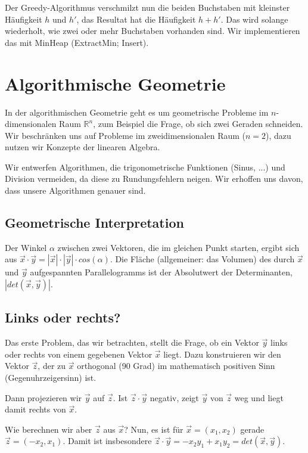 \documentclass[12pt]{article}
\begin{document}
Der Greedy-Algorithmus verschmilzt nun die beiden Buchstaben mit kleinster Häufigkeit $h$ und $h'$, das Resultat hat die Häufigkeit $h + h'$. Das wird solange wiederholt, wie zwei oder mehr Buchstaben vorhanden sind. Wir implementieren das mit MinHeap (ExtractMin; Insert).

\section{Algorithmische Geometrie}

In der algorithmischen Geometrie geht es um geometrische Probleme im $n$-dimensionalen Raum $\mathbb{R}^n$, zum Beispiel die Frage, ob sich zwei Geraden schneiden. Wir beschränken uns auf Probleme im zweidimensionalen Raum ($n = 2$), dazu nutzen wir Konzepte der linearen Algebra.

Wir entwerfen Algorithmen, die trigonometrische Funktionen (Sinus, ...) und Division vermeiden, da diese zu Rundungsfehlern neigen. Wir erhoffen uns davon, dass unsere Algorithmen genauer sind.

\subsection{Geometrische Interpretation}

Der Winkel $\alpha$ zwischen zwei Vektoren, die im gleichen Punkt starten, ergibt sich aus $\vec{x} \cdot \vec{y} = |\vec{x}| \cdot |\vec{y}| \cdot cos(\alpha)$. Die Fläche (allgemeiner: das Volumen) des durch $\vec{x}$ und $\vec{y}$ aufgespannten Parallelogramms ist der Absolutwert der Determinanten, $|det(\vec{x}, \vec{y})|$.

\subsection{Links oder rechts?}

Das erste Problem, das wir betrachten, stellt die Frage, ob ein Vektor $\vec{y}$ links oder rechts von einem gegebenen Vektor $\vec{x}$ liegt. Dazu konstruieren wir den Vektor $\vec{z}$, der zu $\vec{x}$ orthogonal (90 Grad) im mathematisch positiven Sinn (Gegenuhrzeigersinn) ist.

Dann projezieren wir $\vec{y}$ auf $\vec{z}$. Ist $\vec{z} \cdot \vec{y}$ negativ, zeigt $\vec{y}$ von $\vec{z}$ weg und liegt damit rechts von $\vec{x}$.

Wie berechnen wir aber $\vec{z}$ aus $\vec{x}$? Nun, es ist für $\vec{x} = (x_1, x_2)$ gerade $\vec{z} = (-x_2, x_1)$. Damit ist insbesondere $\vec{z} \cdot \vec{y} = -x_2y_1 + x_1y_2 = det(\vec{x}, \vec{y})$.
\end{document}
